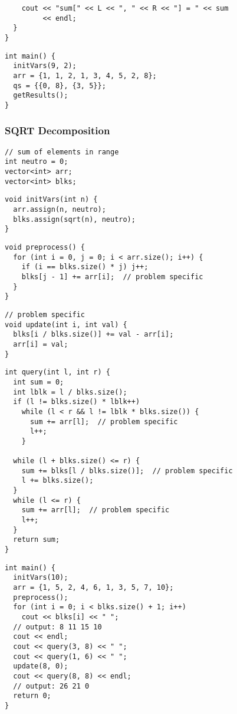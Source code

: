 \documentclass[twoside]{article}
\begin{document}
\begin{multicols*}{2}
\begin{verbatim}
    cout << "sum[" << L << ", " << R << "] = " << sum
         << endl;
  }
}
\end{verbatim}
\vspace{-12pt}
\begin{verbatim}
int main() {
  initVars(9, 2);
  arr = {1, 1, 2, 1, 3, 4, 5, 2, 8};
  qs = {{0, 8}, {3, 5}};
  getResults();
}
\end{verbatim}

\subsubsectionfont{\large\bfseries\sffamily\underline}
\subsubsection*{SQRT Decomposition}
\begin{verbatim}
// sum of elements in range
int neutro = 0;
vector<int> arr;
vector<int> blks;
\end{verbatim}
\vspace{-12pt}
\begin{verbatim}
void initVars(int n) {
  arr.assign(n, neutro);
  blks.assign(sqrt(n), neutro);
}
\end{verbatim}
\vspace{-12pt}
\begin{verbatim}
void preprocess() {
  for (int i = 0, j = 0; i < arr.size(); i++) {
    if (i == blks.size() * j) j++;
    blks[j - 1] += arr[i];  // problem specific
  }
}
\end{verbatim}
\vspace{-12pt}
\begin{verbatim}
// problem specific
void update(int i, int val) {
  blks[i / blks.size()] += val - arr[i];
  arr[i] = val;
}
\end{verbatim}
\vspace{-12pt}
\begin{verbatim}
int query(int l, int r) {
  int sum = 0;
  int lblk = l / blks.size();
  if (l != blks.size() * lblk++)
    while (l < r && l != lblk * blks.size()) {
      sum += arr[l];  // problem specific
      l++;
    }

  while (l + blks.size() <= r) {
    sum += blks[l / blks.size()];  // problem specific
    l += blks.size();
  }
  while (l <= r) {
    sum += arr[l];  // problem specific
    l++;
  }
  return sum;
}
\end{verbatim}
\vspace{-12pt}
\begin{verbatim}
int main() {
  initVars(10);
  arr = {1, 5, 2, 4, 6, 1, 3, 5, 7, 10};
  preprocess();
  for (int i = 0; i < blks.size() + 1; i++)
    cout << blks[i] << " ";
  // output: 8 11 15 10
  cout << endl;
  cout << query(3, 8) << " ";
  cout << query(1, 6) << " ";
  update(8, 0);
  cout << query(8, 8) << endl;
  // output: 26 21 0
  return 0;
}
\end{verbatim}


\end{multicols*}
\end{document}
